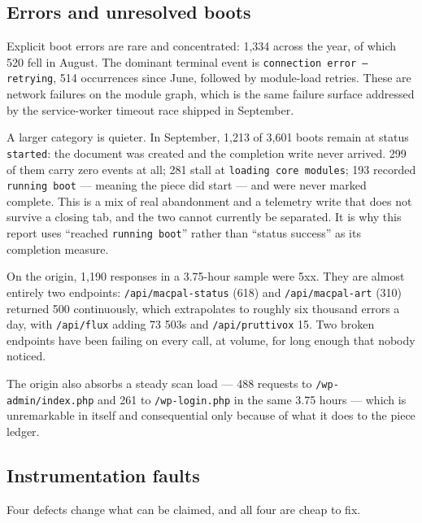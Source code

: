 \documentclass[10pt,letterpaper,twocolumn]{article}
\begin{document}
\subsection{Errors and unresolved boots}

Explicit boot errors are rare and concentrated: 1,334 across the year,
of which 520 fell in August. The dominant terminal event is
\texttt{connection error --- retrying}, 514 occurrences since June,
followed by module-load retries. These are network failures on the
module graph, which is the same failure surface addressed by the
service-worker timeout race shipped in September.

A larger category is quieter. In September, 1,213 of 3,601 boots
remain at status \texttt{started}: the document was created and the
completion write never arrived. 299 of them carry zero events at all;
281 stall at \texttt{loading core modules}; 193 recorded
\texttt{running boot} --- meaning the piece did start --- and were never
marked complete. This is a mix of real abandonment and a telemetry
write that does not survive a closing tab, and the two cannot currently
be separated. It is why this report uses ``reached \texttt{running
boot}'' rather than ``status success'' as its completion measure.

On the origin, 1,190 responses in a 3.75-hour sample were 5xx.
They are almost entirely two endpoints: \texttt{/api/macpal-status}
(618) and \texttt{/api/macpal-art} (310) returned 500 continuously,
which extrapolates to roughly six thousand errors a day, with
\texttt{/api/flux} adding 73 503s and \texttt{/api/pruttivox} 15.
Two broken endpoints have been failing on every call, at volume, for
long enough that nobody noticed.

The origin also absorbs a steady scan load --- 488 requests to
\texttt{/wp-admin/index.php} and 261 to \texttt{/wp-login.php} in the
same 3.75 hours --- which is unremarkable in itself and consequential
only because of what it does to the piece ledger.

\subsection{Instrumentation faults}
\label{sec:faults}

Four defects change what can be claimed, and all four are cheap to fix.
\end{document}
